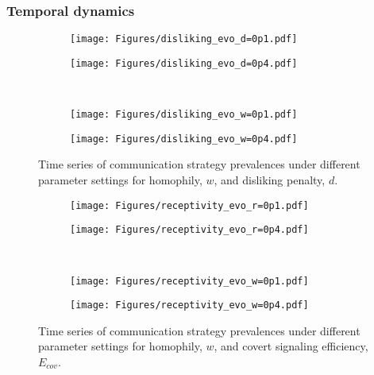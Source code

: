\documentclass[11pt,letterpaper]{article}
\begin{document}
\subsubsection{Temporal dynamics}

\begin{figure}[H]
  \centering
  \begin{subfigure}{0.49\textwidth}
    \texttt{[image: Figures/disliking\_evo\_d=0p1.pdf]}
  \caption{}
  \end{subfigure}
  \begin{subfigure}{0.49\textwidth}
    \texttt{[image: Figures/disliking\_evo\_d=0p4.pdf]}
  \caption{}
  \end{subfigure} \\
  \begin{subfigure}{0.49\textwidth}
    \texttt{[image: Figures/disliking\_evo\_w=0p1.pdf]}
  \caption{}
  \end{subfigure}
  \begin{subfigure}{0.49\textwidth}
    \texttt{[image: Figures/disliking\_evo\_w=0p4.pdf]}
  \caption{}
  \end{subfigure}
  \caption{Time series of communication strategy prevalences under different parameter settings
  for homophily, $w$, and disliking penalty, $d$.}
  \label{fig:}
\end{figure}

\begin{figure}[H]
  \centering
  \begin{subfigure}{0.49\textwidth}
    \texttt{[image: Figures/receptivity\_evo\_r=0p1.pdf]}
  \caption{}
  \end{subfigure}
  \begin{subfigure}{0.49\textwidth}
    \texttt{[image: Figures/receptivity\_evo\_r=0p4.pdf]}
  \caption{}
  \end{subfigure} \\
  \begin{subfigure}{0.49\textwidth}
    \texttt{[image: Figures/receptivity\_evo\_w=0p1.pdf]}
  \caption{}
  \end{subfigure}
  \begin{subfigure}{0.49\textwidth}
    \texttt{[image: Figures/receptivity\_evo\_w=0p4.pdf]}
  \caption{}
  \end{subfigure}
  \caption{Time series of communication strategy prevalences under different parameter settings
  for homophily, $w$, and covert signaling efficiency, $E_{cov}$.}
  \label{fig:}
\end{figure}
\end{document}
